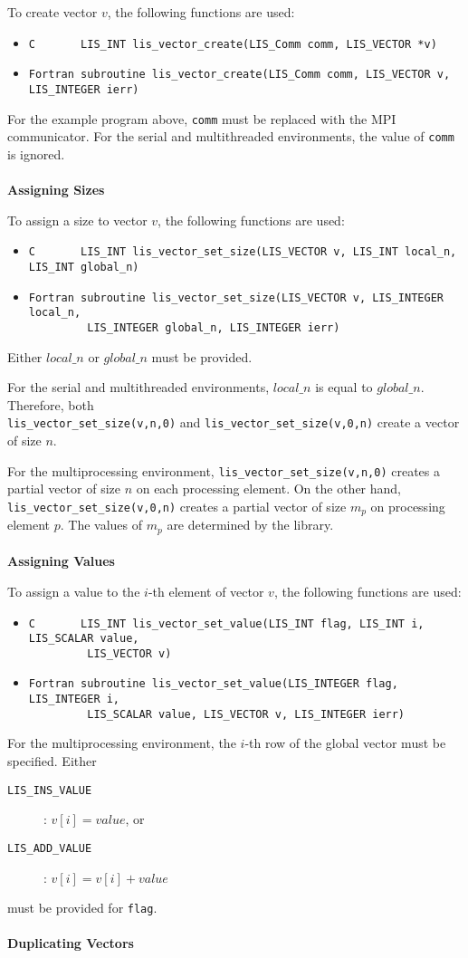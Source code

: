\documentclass[a4paper]{article}
\begin{document}
To create vector $v$, the following functions are used: 
\begin{itemize}
\item \verb|C       LIS_INT lis_vector_create(LIS_Comm comm, LIS_VECTOR *v)|
\item \verb|Fortran subroutine lis_vector_create(LIS_Comm comm, LIS_VECTOR v, LIS_INTEGER ierr)|
\end{itemize}
For the example program above, {\tt comm} must be replaced with the MPI communicator. 
For the serial and multithreaded environments, the value of {\tt comm} is ignored.
\\ \\
\noindent
{\bf Assigning Sizes}

To assign a size to vector $v$, the following functions are used: 
\begin{itemize}
\item \verb|C       LIS_INT lis_vector_set_size(LIS_VECTOR v, LIS_INT local_n, LIS_INT global_n)|
\item \verb|Fortran subroutine lis_vector_set_size(LIS_VECTOR v, LIS_INTEGER local_n,|\\
      \verb|         LIS_INTEGER global_n, LIS_INTEGER ierr)| 
\end{itemize}
Either $local\_n$ or $global\_n$ must be provided.

For the serial and multithreaded environments, $local\_n$ 
is equal to $global\_n$. 
Therefore, both \\
\verb|lis_vector_set_size(v,n,0)| and \verb|lis_vector_set_size(v,0,n)| create a vector of size $n$. 

For the multiprocessing environment, \verb|lis_vector_set_size(v,n,0)| 
creates a partial vector of size $n$ on each processing element. On the other hand, 
\verb|lis_vector_set_size(v,0,n)| creates a partial vector of size 
$m_p$ on processing element $p$. The values of $m_p$ are determined by the library. 
\\ \\
\noindent
{\bf Assigning Values}

To assign a value to the $i$-th element of vector $v$, the following functions are used:
\begin{itemize}
\item \verb|C       LIS_INT lis_vector_set_value(LIS_INT flag, LIS_INT i, LIS_SCALAR value,|\\
      \verb|         LIS_VECTOR v)|
\item \verb|Fortran subroutine lis_vector_set_value(LIS_INTEGER flag, LIS_INTEGER i,|\\
      \verb|         LIS_SCALAR value, LIS_VECTOR v, LIS_INTEGER ierr)|
\end{itemize}
For the multiprocessing environment, the $i$-th row of the global vector must be
specified. 
Either
\begin{description}
\item[\tt LIS\_INS\_VALUE]: $v[i] = value$, or
\item[\tt LIS\_ADD\_VALUE]: $v[i] = v[i] + value$
\end{description}
must be provided for \verb+flag+.
\\ \\
\noindent
{\bf Duplicating Vectors}
\end{document}
